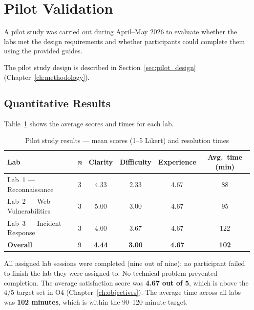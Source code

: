 
\section{Pilot Validation}\label{sec:pilot_validation}

A pilot study was carried out during April--May 2026 to evaluate
whether the labs met the design requirements and whether participants could
complete them using the provided guides.

The pilot study design is described in Section~\ref{sec:pilot_design} (Chapter~\ref{ch:methodology}).

\subsection{Quantitative Results}

Table~\ref{tab:pilot_results} shows the average scores and times for each
lab.

\begin{table}[H]
  \centering
  \small
  \setlength{\tabcolsep}{5pt}
  \renewcommand{\arraystretch}{1.15}
  \begin{tabularx}{\textwidth}{X c c c c c}
    \toprule
    \textbf{Lab} & \textbf{\textit{n}} & \textbf{Clarity} &
    \textbf{Difficulty} & \textbf{Experience} &
    \textbf{Avg.\ time (min)} \\
    \midrule
    Lab~1 --- Reconnaissance      & 3 & 4.33 & 2.33 & 4.67 & 88  \\
    Lab~2 --- Web Vulnerabilities  & 3 & 5.00 & 3.00 & 4.67 & 95  \\
    Lab~3 --- Incident Response    & 3 & 4.00 & 3.67 & 4.67 & 122 \\
    \midrule
    \textbf{Overall}              & 9 & \textbf{4.44} & \textbf{3.00} &
                                       \textbf{4.67} & \textbf{102} \\
    \bottomrule
  \end{tabularx}
  \caption{Pilot study results --- mean scores (1--5 Likert) and resolution times}
  \label{tab:pilot_results}
\end{table}

All assigned lab sessions were completed (nine out of nine); no participant failed to finish the lab they were assigned to. No technical problem prevented completion. The average satisfaction score was \textbf{4.67 out
of 5}, which is above the 4/5 target set in O4 (Chapter~\ref{ch:objectives}). The average
time across all labs was \textbf{102 minutes}, which is within the 90--120
minute target.

